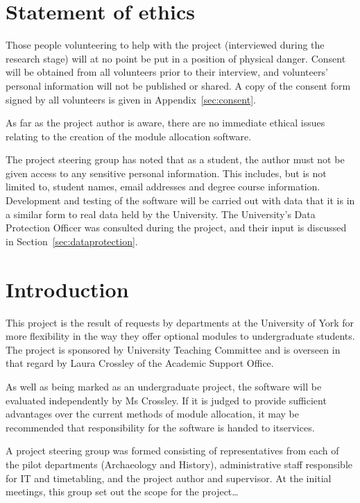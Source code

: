 \documentclass[]{scrartcl}
\begin{document}
\section{Statement of ethics}


Those people volunteering to help with the project (interviewed during the
research stage) will at no point be put in a position of physical danger.
Consent will be obtained from all volunteers prior to their interview, and
volunteers' personal information will not be published or shared. A copy of
the consent form signed by all volunteers is given in
Appendix~\ref{sec:consent}.


As far as the project author is aware, there are no immediate ethical issues
relating to the creation of the module allocation software.


The project steering group has noted that as a student, the author must not be
given access to any sensitive personal information. This includes, but is not
limited to, student names, email addresses and degree course information.
Development and testing of the software will be carried out with data that it
is in a similar form to real data held by the University. The University's
Data Protection Officer was consulted during the project, and their input is
discussed in Section~\ref{sec:dataprotection}.

\section{Introduction}


This project is the result of requests by departments at the University of
York for more flexibility in the way they offer optional modules to
undergraduate students. The project is sponsored by University Teaching
Committee and is overseen in that regard by Laura Crossley of the Academic
Support Office.

As well as being marked as an undergraduate project, the software will be
evaluated independently by Ms Crossley. If it is judged to provide sufficient
advantages over the current methods of module allocation, it may be
recommended that responsibility for the software is handed to \gls{itservices}.

A project steering group was formed consisting of representatives from each of
the pilot departments (Archaeology and History), administrative staff
responsible for IT and timetabling, and the project author and supervisor. At
the initial meetings, this group set out the scope for the project…
\end{document}
